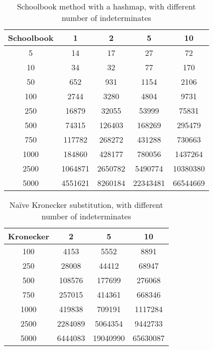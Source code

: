 \begin{table}[h]
\centering
    \begin{tabular}{|c| c c c c|}
        \hline
        Schoolbook & 1 & 2 & 5 & 10\\
        \hline
        5 & 14 & 17 & 27 & 72\\
        10 & 34 & 32 & 77 & 170\\
        50 & 652 & 931 & 1154 & 2106\\
        100 & 2744 & 3280 & 4804 & 9731\\
        250 & 16879 & 32055 & 53999 & 75831\\
        500 & 74315 & 126403 & 168269 & 295479\\
        750 & 117782 & 268272 & 431288 & 730663\\
        1000 & 184860 & 428177 & 780056 & 1437264\\
        2500 & 1064871 & 2650782 & 5490774 & 10380380\\
        5000 & 4551621 & 8260184 & 22343481 & 66544669\\
        \hline
    \end{tabular}
    \caption{Schoolbook method with a hashmap, with different number of indeterminates}
\end{table}
\begin{table}[h]
\centering
    \begin{tabular}{|c| c c c|}
        \hline
        Kronecker & 2 & 5 & 10\\
        \hline
        100 & 4153 & 5552 & 8891 \\
        250 & 28008 & 44412 & 68947 \\
        500 & 108576 & 177699 & 276068\\
        750 & 257015 & 414361 & 668346\\ 
        1000 & 419838 & 709191 & 1117284\\
        2500 & 2284089 & 5064354 & 9442733\\
        5000 & 6444083 & 19040990 & 65630087\\
        \hline
    \end{tabular}
    \caption{Na\"{i}ve Kronecker substitution, with different number of indeterminates}
\end{table}




